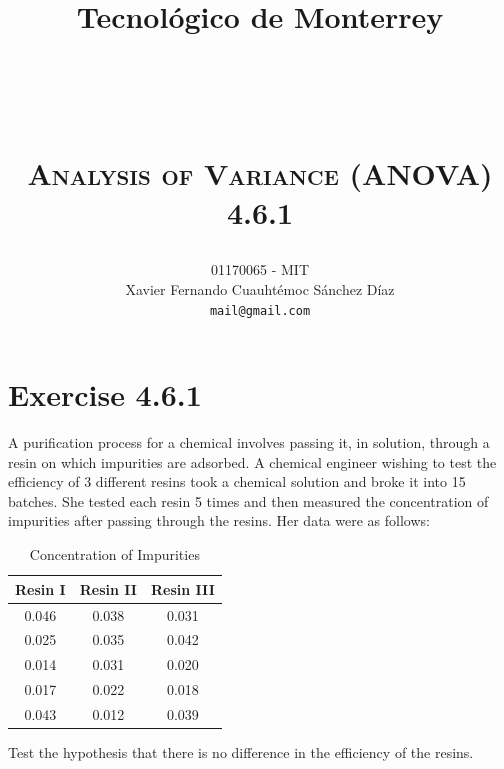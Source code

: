 \documentclass[titlepage, letterpaper, fleqn]{article}
\title{
\vspace{1in}
\textbf{Tecnológico de Monterrey} \\
\vspace{0.5in}
\textmd{\mahclass} \\
\large{\textit{\mahteacher}} \\
\vspace{0.5in}
\textsc{\mahtitle}\\
\textsc{Analysis of Variance (ANOVA)}\\
\textsc{4.6.1}\\
\author{01170065  - MIT \\
Xavier Fernando Cuauhtémoc Sánchez Díaz \\
\texttt{mail@gmail.com}}
\date{\mahdate}
}
\begin{document}
\begin{titlepage}
\maketitle
\end{titlepage}

%
%

\section{Exercise 4.6.1}

{\large A purification process for a chemical involves passing it, in solution, through a resin on which impurities are adsorbed.
A chemical engineer wishing to test the efficiency of 3 different resins took a chemical solution and broke it into 15 batches.
She tested each resin 5 times and then measured the concentration of impurities after passing through the resins. Her data were as follows:}

\begin{table}[h!]
\centering
\begin{tabular}{@{}ccc@{}}
\toprule
Resin I & Resin II & Resin III \\ \midrule
0.046 & 0.038 & 0.031 \\
0.025 & 0.035 & 0.042 \\
0.014 & 0.031 & 0.020 \\
0.017 & 0.022 & 0.018 \\
0.043 & 0.012 & 0.039 \\ \bottomrule
\end{tabular}
\caption{Concentration of Impurities}
\label{tab4.6.1}
\end{table}

{\large Test the hypothesis that there is no difference in the efficiency of the resins.}
\end{document}
